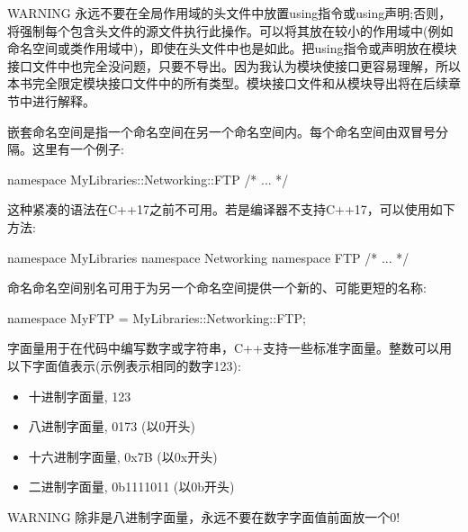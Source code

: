 \begin{myWarning}{WARNING}
永远不要在全局作用域的头文件中放置using指令或using声明;否则，将强制每个包含头文件的源文件执行此操作。可以将其放在较小的作用域中(例如命名空间或类作用域中)，即使在头文件中也是如此。把using指令或声明放在模块接口文件中也完全没问题，只要不导出。因为我认为模块使接口更容易理解，所以本书完全限定模块接口文件中的所有类型。模块接口文件和从模块导出将在后续章节中进行解释。
\end{myWarning}


嵌套命名空间是指一个命名空间在另一个命名空间内。每个命名空间由双冒号分隔。这里有一个例子:

\begin{cpp}
namespace MyLibraries::Networking::FTP {
    /* ... */
}
\end{cpp}

这种紧凑的语法在C++17之前不可用。若是编译器不支持C++17，可以使用如下方法:

\begin{cpp}
namespace MyLibraries {
    namespace Networking {
        namespace FTP {
            /* ... */
        }
    }
}
\end{cpp}


命名命名空间别名可用于为另一个命名空间提供一个新的、可能更短的名称:

\begin{cpp}
namespace MyFTP = MyLibraries::Networking::FTP;
\end{cpp}


字面量用于在代码中编写数字或字符串，C++支持一些标准字面量。整数可以用以下字面值表示(示例表示相同的数字123):

\begin{itemize}
\item
十进制字面量, 123

\item
八进制字面量, 0173 (以0开头)

\item
十六进制字面量, 0x7B (以0x开头)

\item
二进制字面量, 0b1111011 (以0b开头)
\end{itemize}

\begin{myWarning}{WARNING}
除非是八进制字面量，永远不要在数字字面值前面放一个0!
\end{myWarning}

